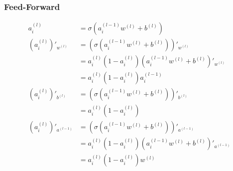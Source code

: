 \documentclass{article}
\begin{document}
\subsubsection{Feed-Forward}
\begin{align}
    a_i^{(l)}                & = \sigma(a_i^{(l-1)}w^{(l)} + b^{(l)})                                 \\
    (a_i^{(l)})'_{w^{(l)}}   & = \left(\sigma(a_i^{(l-1)}w^{(l)} + b^{(l)})\right)'_{w^{(l)}}         \\
                             & = a_i^{(l)} (1 - a_i^{(l)}) (a_i^{(l-1)}w^{(l)} + b^{(l)})'_{w^{(l)}}  \\
                             & = a_i^{(l)} (1 - a_i^{(l)}) a_i^{(l-1)}                                \\
    (a_i^{(l)})'_{b^{(l)}}   & = \left(\sigma(a_i^{(l-1)}w^{(l)} + b^{(l)})\right)'_{b^{(l)}}         \\
                             & = a_i^{(l)} (1 - a_i^{(l)})                                            \\
    (a_i^{(l)})'_{a^{(l-1)}} & = \left(\sigma(a_i^{(l-1)}w^{(l)} + b^{(l)})\right)'_{a^{(l-1)}}       \\
                             & = a_i^{(l)} (1 - a_i^{(l)})(a_i^{(l-1)}w^{(l)} + b^{(l)})'_{a^{(l-1)}} \\
                             & = a_i^{(l)} (1 - a_i^{(l)})w^{(l)}
\end{align}
\end{document}

